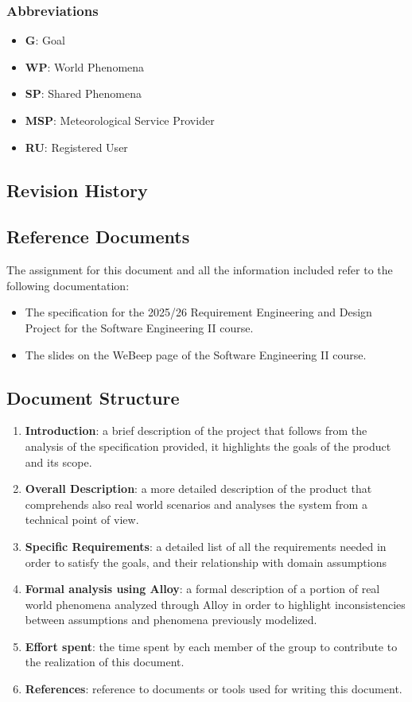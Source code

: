\documentclass{article}
\begin{document}
\subsubsection{Abbreviations}
\begin{itemize}
    \item \textbf{G}: Goal
    \item \textbf{WP}: World Phenomena
    \item \textbf{SP}: Shared Phenomena
    \item \textbf{MSP}: Meteorological Service Provider
    \item \textbf{RU}: Registered User

\end{itemize}


\subsection{Revision History}



\subsection{Reference Documents}
The assignment for this document and all the information included refer to the following
documentation:
\begin{itemize}
    \item The specification for the 2025/26 Requirement Engineering and Design Project for the Software Engineering II course.
    \item The slides on the WeBeep page of the Software Engineering II course.
\end{itemize}


\subsection{Document Structure}
\begin{enumerate}
    \item \textbf{Introduction}: a brief description of the project that follows from the analysis of the specification provided, it highlights the goals of the product and its scope.
    \item \textbf{Overall Description}: a more detailed description of the product that comprehends also real world scenarios and analyses the system from a technical point of view.
    \item \textbf{Specific Requirements}: a detailed list of all the requirements needed in order to satisfy the goals, and their relationship with domain assumptions
    \item \textbf{Formal analysis using Alloy}: a formal description of a portion of real world phenomena analyzed through Alloy in order to highlight inconsistencies between assumptions and phenomena previously modelized.
    \item \textbf{Effort spent}: the time spent by each member of the group to contribute to the realization of this document.
    \item \textbf{References}: reference to documents or tools used for writing this document.
\end{enumerate}
\newpage
\end{document}
